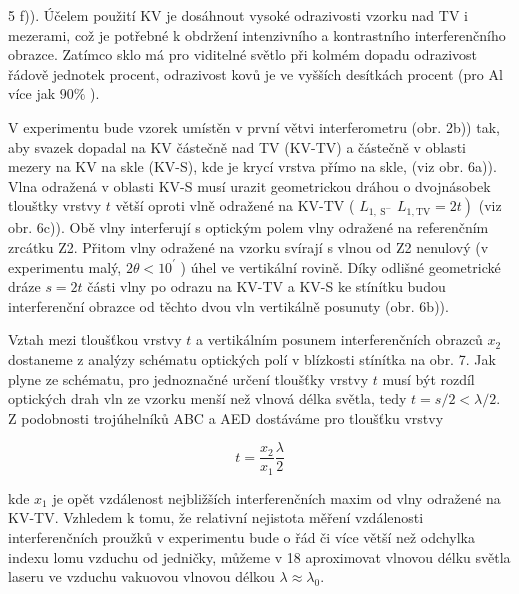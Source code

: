 \documentclass[czech,11pt,a4paper]{article}
\begin{document}
\begin{multicols}{2}
	
	5 f)). Účelem použití KV je dosáhnout vysoké odrazivosti vzorku nad TV i mezerami, což je potřebné k obdržení intenzivního a kontrastního interferenčního obrazce. Zatímco sklo má pro viditelné světlo při kolmém dopadu odrazivost řádově jednotek procent, odrazivost kovů je ve vyšších desítkách procent (pro Al více jak $90 \%$ ).
	
	V experimentu bude vzorek umístěn v první větvi interferometru (obr. 2b)) tak, aby svazek dopadal na KV částečně nad TV (KV-TV) a částečně v oblasti mezery na KV na skle (KV-S), kde je krycí vrstva přímo na skle, (viz obr. 6a)). Vlna odražená v oblasti KV-S musí urazit geometrickou dráhou o dvojnásobek tlouštky vrstvy $t$ větší oproti vlně odražené na KV-TV ( $L_{1, \mathrm{~S}^{-}}$ $\left.L_{1, \mathrm{TV}}=2 t\right)$ (viz obr. 6c)). Obě vlny interferují s optickým polem vlny odražené na referenčním zrcátku Z2. Přitom vlny odražené na vzorku svírají s vlnou od Z2 nenulový (v experimentu malý, $2 \theta<10^{\prime}$ ) úhel ve vertikální rovině. Díky odlišné geometrické dráze $s=2 t$ části vlny po odrazu na KV-TV a KV-S ke stínítku budou interferenční obrazce od těchto dvou vln vertikálně posunuty (obr. 6b)).
	
	Vztah mezi tloušťkou vrstvy $t$ a vertikálním posunem interferenčních obrazců $x_{2}$ dostaneme z analýzy schématu optických polí v blízkosti stínítka na obr. 7. Jak plyne ze schématu, pro jednoznačné určení tloušťky vrstvy $t$ musí být rozdíl optických drah vln ze vzorku menší než vlnová délka světla, tedy $t=s / 2<\lambda / 2$. Z podobnosti trojúhelníků ABC a AED dostáváme pro tloušťku vrstvy
	
	
	\begin{equation}
		t=\frac{x_{2}}{x_{1}} \frac{\lambda}{2}
	\end{equation}
	
	
	kde $x_{1}$ je opět vzdálenost nejbližších interferenčních maxim od vlny odražené na KV-TV. Vzhledem k tomu, že relativní nejistota měření vzdálenosti interferenčních proužků v experimentu bude o řád či více větší než odchylka indexu lomu vzduchu od jedničky, můžeme v 18 aproximovat vlnovou délku světla laseru ve vzduchu vakuovou vlnovou délkou $\lambda \approx \lambda_{0}$.\\
	

\end{multicols}
\end{document}
